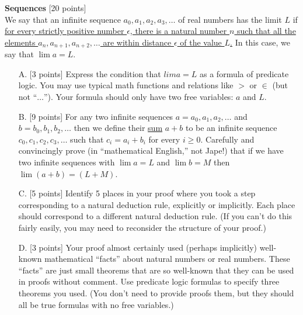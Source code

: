 \documentclass[12pt,letterpaper,boxed,cm]{hmcpset}
\begin{document}

\begin{problem}[1.]
    \textbf{Sequences} [20 points]\\
    We say that an infinite sequence $a_0,a_1,a_2,a_3,\ldots$ of real numbers has the limit $L$ if \ul{for every strictly positive number $\epsilon$, there is a natural number $n$ such that all the elements $a_n,a_{n+1},a_{n+2},\ldots$  are within distance $\epsilon$ of the value $L$.} In this case, we say that $\lim a = L$.
    \begin{enumerate}
        \item [A.] [3 points] Express the condition that $lim a = L$ as a formula of predicate logic. You may use typical math functions and relations like $>$ or $\in$ (but not “$\ldots$”).   Your formula should only have two free variables: $a$ and $L$.
        \item [B.] [9 points] For any two infinite sequences $a = a_0,a_1,a_2,\ldots$ and $b  =  b_0,b_1,b_2,\ldots$ then we define their \ul{sum} $a+b$ to be an infinite sequence $c_0,c_1,c_2,c_3,\ldots$ such that $c_i = a_i + b_i$ for every $i\ge0$. Carefully and convincingly prove (in “mathematical English,” not Jape!) that if we have two infinite sequences with $\lim a = L$  and  $\lim b = M$  then $\lim (a+b) = (L+M)$. 
        \item [C.] [5 points] Identify 5 places in your proof where you took a step corresponding to a natural deduction rule, explicitly or implicitly. Each place should correspond to a different natural deduction rule.  (If you can’t do this fairly easily, you may need to reconsider the structure of your proof.)
        \item [D.] [3 points] Your proof almost certainly used (perhaps implicitly) well-known mathematical “facts” about natural numbers or real numbers.  These “facts” are just small theorems that are so well-known that they can be used in proofs without comment. Use predicate logic formulas to specify three theorems you used. (You don’t need to provide proofs them, but they should all be true formulas with no free variables.)
    \end{enumerate}
\end{problem}

\begin{solution}
    \vfill
\end{solution}
\newpage
\end{document}
